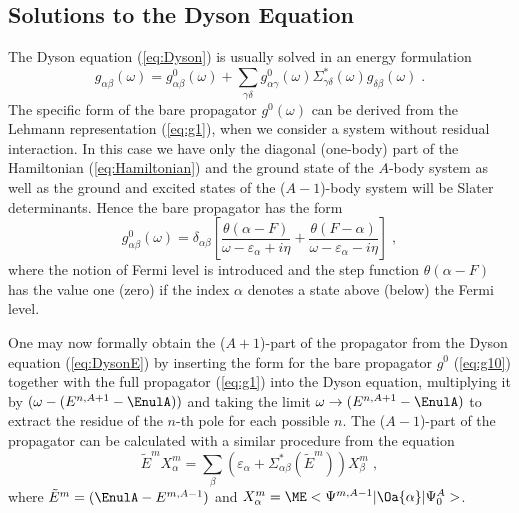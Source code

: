 \subsection{Solutions to the Dyson Equation\label{sec:DYSsol}}

The Dyson equation (\ref{eq:Dyson}) is usually solved in an energy 
formulation
%
	\begin{equation}
		g_{\alpha\beta}(\omega)
	=
		g^0_{\alpha\beta}(\omega)
	+
		\sum_{\gamma\delta}
		g^0_{\alpha\gamma}(\omega)
		\Sigma^\ast_{\gamma\delta}(\omega)
		g^{\phantom{0}}_{\delta\beta}(\omega)
	\;.
	\label{eq:DysonE}
	\end{equation}
%
The specific form of the bare propagator $g^0(\omega)$ can be derived from
the Lehmann representation (\ref{eq:g1}), when we consider a system without
residual interaction. In this case we have only the diagonal (one-body) part 
of the
Hamiltonian (\ref{eq:Hamiltonian}) and the ground state of the $A$-body
system as well as the ground and excited states of the ($A-1$)-body system 
will be 
Slater determinants. Hence the bare propagator has the form
%
	\begin{equation}
		g^0_{\alpha\beta}(\omega)
	=
		\delta_{\alpha\beta}
		\left[
		\frac{
		\theta( \alpha - F )
		}{ \omega - \varepsilon_\alpha + i \eta }
	+
		\frac{
		\theta( F - \alpha )
		}{ \omega - \varepsilon_\alpha - i \eta }
		\right]
	\label{eq:g10} 
	\;,
	\end{equation}
%
where the notion of Fermi level is introduced and the step function
$\theta(\alpha-F)$ has the value one (zero) if the index $\alpha$ 
denotes a state above (below) the Fermi level. 

One may now formally obtain the ($A+1$)-part of the propagator from the Dyson 
equation (\ref{eq:DysonE}) by
inserting the form for the bare propagator $g^0$ (\ref{eq:g10}) together with
the full
propagator (\ref{eq:g1}) into the Dyson equation, multiplying it by
$(\omega - (E^{n,A+1}- \EnulA))$ and taking the limit 
$\omega \rightarrow (E^{n,A+1}- \EnulA)$ to extract the residue of the $n$-th
pole for each possible $n$.
The ($A-1$)-part of the propagator can be calculated with a similar procedure
from the equation
%
	\begin{equation}
		\tilde{E}^m  
		X_\alpha^m
	=
		\sum_\beta
		\left(
			\varepsilon_\alpha +
			\Sigma^\ast_{\alpha\beta}(\tilde{E}^m)
		\right)
		X_\beta^m
	\label{eq:DysDis}
	\;,
	\end{equation}
%
where $\tilde{E}^m = (\EnulA - E^{m,A-1})$ and 
$X_\alpha^m=\ME<\Psi^{m,A-1}| \Oa{\alpha} | \Psi^A_0 >$.

